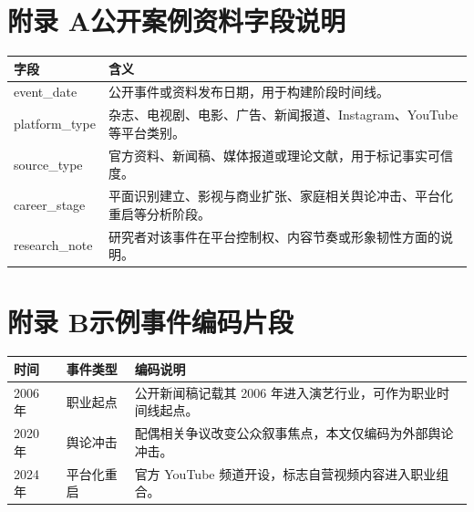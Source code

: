 \section*{附录 A\quad 公开案例资料字段说明}

\noindent\begin{tabular}{@{}p{3.6cm}p{11.4cm}@{}}
\toprule
字段 & 含义\\
\midrule
event\_date & 公开事件或资料发布日期，用于构建阶段时间线。\\
platform\_type & 杂志、电视剧、电影、广告、新闻报道、Instagram、YouTube 等平台类别。\\
source\_type & 官方资料、新闻稿、媒体报道或理论文献，用于标记事实可信度。\\
career\_stage & 平面识别建立、影视与商业扩张、家庭相关舆论冲击、平台化重启等分析阶段。\\
research\_note & 研究者对该事件在平台控制权、内容节奏或形象韧性方面的说明。\\
\bottomrule
\end{tabular}

\section*{附录 B\quad 示例事件编码片段}

\noindent\begin{tabularx}{\textwidth}{@{}p{2.8cm}p{3.2cm}X@{}}
\toprule
时间 & 事件类型 & 编码说明\\
\midrule
2006 年 & 职业起点 & 公开新闻稿记载其 2006 年进入演艺行业，可作为职业时间线起点。\\
2020 年 & 舆论冲击 & 配偶相关争议改变公众叙事焦点，本文仅编码为外部舆论冲击。\\
2024 年 & 平台化重启 & 官方 YouTube 频道开设，标志自营视频内容进入职业组合。\\
\bottomrule
\end{tabularx}

